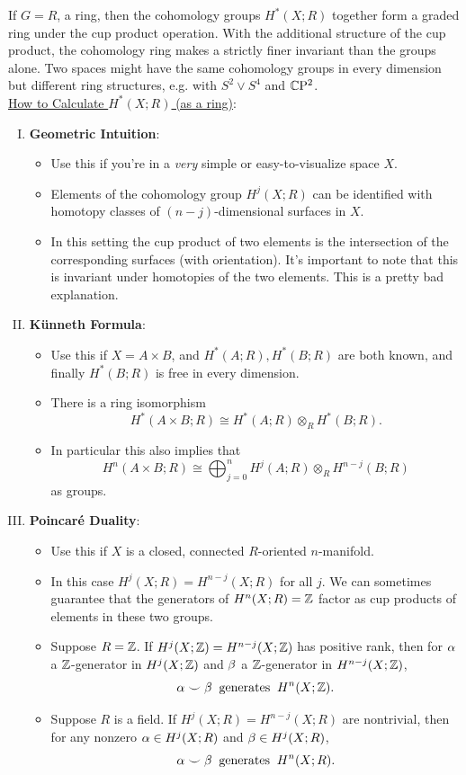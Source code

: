 \documentclass{amsart}
\begin{document}
		If $G=R$, a ring, then the cohomology groups $H^*(X;R)$ together form a graded ring under the cup product operation. With the additional structure of the cup product, the cohomology ring makes a strictly finer invariant than the groups alone. Two spaces might have the same cohomology groups in every dimension but different ring structures, e.g. with $S^2\vee S^4$ and $\mathbb{C}\mathrm{P}^2$.\\
	
	\underline{How to Calculate $H^*(X;R)$ (as a ring)}:
	\begin{enumerate}[(I)]
		\item \textbf{Geometric Intuition}:
		\begin{itemize}
			\item Use this if you're in a \textit{very} simple or easy-to-visualize space $X$.
			\item Elements of the cohomology group $H^j(X;R)$ can be identified with homotopy classes of $(n-j)$-dimensional surfaces in $X$.
			\item In this setting the cup product of two elements is the intersection of the corresponding surfaces (with orientation). It's important to note that this is invariant under homotopies of the two elements. This is a pretty bad explanation.
		\end{itemize}
		\item \textbf{K\"unneth Formula}:
	\begin{itemize}
	\item Use this if $X=A\times B$, and $H^*(A;R),H^*(B;R)$ are both known, and finally $H^*(B;R)$ is free in every dimension.
	\item There is a ring isomorphism
	$$
	H^*(A\times B;R) \cong H^*(A;R)\otimes_R H^*(B;R).
	$$
	\item In particular this also implies that 
	$$
	H^n(A\times B;R) \cong \bigoplus_{j=0}^n H^j(A;R)\otimes_R H^{n-j}(B;R) 
	$$
	as groups.
	\end{itemize}
	\item \textbf{Poincar\'e Duality}:
	\begin{itemize}
		\item Use this if $X$ is a closed, connected $R$-oriented $n$-manifold. 
		\item In this case $H^j(X;R)=H^{n-j}(X;R)$ for all $j$. We can sometimes guarantee that the generators of $H^n(X;R)=\mathbb{Z}$ factor as cup products of elements in these two groups.
		\item Suppose $R=\mathbb{Z}$. If $H^j(X;\mathbb{Z})=H^{n-j}(X;\mathbb{Z})$ has positive rank, then for $\alpha$ a $\mathbb{Z}$-generator in $H^j(X;\mathbb{Z})$ and $\beta$ a $\mathbb{Z}$-generator in $H^{n-j}(X;\mathbb{Z})$, 
		$$
		\alpha \smile \beta \;\; \text{generates} \;\; H^n(X;\mathbb{Z}).
		$$
		\item Suppose $R$ is a field. If $H^j(X;R)=H^{n-j}(X;R)$ are nontrivial, then for any nonzero $\alpha\in H^j(X;R)$ and $\beta\in H^j(X;R)$,
		$$
		\alpha \smile \beta \;\; \text{generates} \;\; H^n(X;R).
		$$
	\end{itemize}
	\end{enumerate}
	
\end{document}
